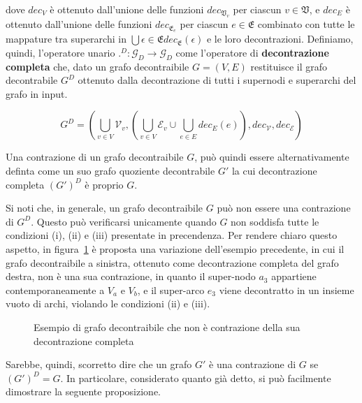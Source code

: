 dove $dec_V$ è ottenuto dall'unione delle funzioni $dec_{\mathfrak{V}_v}$ per ciascun $v \in \mathfrak{V}$,
e $dec_E$ è ottenuto dall'unione delle funzioni $dec_{\mathfrak{E}_e}$ per ciascun $e \in \mathfrak{E}$ combinato con
tutte le mappature tra superarchi in $\bigcup{\epsilon \in \mathfrak{E}} dec_{\mathfrak{E}}(\epsilon)$ e le loro
decontrazioni.
Definiamo, quindi, l'operatore unario $.^D : \mathcal{G}_D \rightarrow \mathcal{G}_D$ come l'operatore di
\textbf{decontrazione completa} che, dato un grafo decontraibile $G = (V, E)$ restituisce il grafo decontrabile
$G^D$ ottenuto dalla decontrazione di tutti i supernodi e superarchi del grafo in input.

\begin{equation*}
    G^D = (\bigcup_{v \in V} \mathcal{V}_v , (\bigcup_{v \in V} \mathcal{E}_v \cup \bigcup_{e \in E} dec_E(e)),
    dec_{\mathcal{V}}, dec_{\mathcal{E}})
\end{equation*}

Una contrazione di un grafo decontraibile $G$, pu\`o quindi essere alternativamente definta come un suo grafo
quoziente decontrabile $G'$ la cui decontrazione completa $(G')^D$ \`e proprio $G$.
\newline

Si noti che, in generale, un grafo decontraibile $G$ pu\`o non essere una contrazione di $G^D$.
Questo pu\`o verificarsi unicamente quando $G$ non soddisfa tutte le condizioni (i), (ii) e (iii) presentate in
precendenza. \newline
Per rendere chiaro questo aspetto, in figura~\ref{fig:non-contraction-example} \`e proposta una variazione
dell'esempio precedente, in cui il grafo decontraibile a sinistra, ottenuto come decontrazione completa del grafo
destra, non \`e una sua contrazione, in quanto il super-nodo $a_3$ appartiene contemporaneamente a $V_a$ e $V_b$,
e il super-arco $e_3$ viene decontratto in un insieme vuoto di archi, violando le condizioni (ii) e (iii).

\begin{figure}
    \centering
    
    \caption{Esempio di grafo decontraibile che non \`e contrazione della sua decontrazione completa}
    \label{fig:non-contraction-example}
\end{figure}

Sarebbe, quindi, scorretto dire che un grafo $G'$ \`e una contrazione di $G$ se $(G')^D = G$.
In particolare, considerato quanto gi\`a detto, si pu\`o facilmente dimostrare la seguente proposizione.

